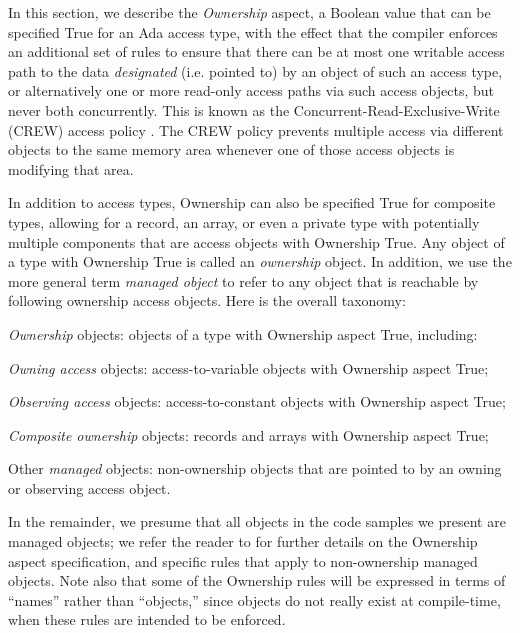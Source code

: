 \documentclass[runningheads]{llncs}
\begin{document}
In this section, we describe the \textit{Ownership} aspect, a Boolean value that can be specified True for an Ada access type, with the effect that the compiler enforces an additional set of rules to ensure that there can be at most one writable access path to the data
\textit{designated} (i.e. pointed to) by an object of such an access type, or alternatively one or more read-only access paths via such access objects, but never both concurrently. This is known as
the Concurrent-Read-Exclusive-Write (CREW) access policy \cite{CREW}. The CREW policy prevents multiple access via different objects to the same memory area whenever one
of those access objects is modifying that area.


In addition to access types, Ownership can also be specified True for composite types, allowing for a record, an array, or even a private type with potentially multiple components that are access objects with Ownership True.  Any object of a type with Ownership True is called an \textit{ownership} object.
In addition, we use the more general term \textit{managed object} to refer to any object that is reachable by following ownership access objects.
Here is the overall taxonomy:

\begin{compactitem}
\item \textit{Ownership} objects: objects of a type with Ownership aspect True, including:
    \begin{compactitem}
\item \textit{Owning access} objects: access-to-variable objects with Ownership aspect True;
\item \textit{Observing access} objects: access-to-constant objects with Ownership aspect True;
\item \textit{Composite ownership} objects: records and arrays with Ownership aspect True;
    \end{compactitem}
\item Other \textit{managed} objects: non-ownership objects that are pointed to by an owning or observing access object.
\end{compactitem}


In the remainder, we presume that all objects in the code samples we present are managed objects; we refer the reader to \cite{AI2018} for further details on
the Ownership aspect specification, and specific rules that apply to non-ownership managed objects. Note also that some of the Ownership rules will be expressed in terms
of ``names'' rather than ``objects,'' since objects do not really exist at compile-time, when these rules are intended to be enforced.
\end{document}
